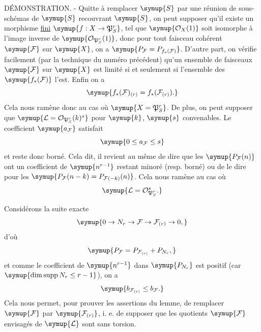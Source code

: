 DÉMONSTRATION. - Quitte à remplacer $\symup{S}$ par une réunion de sous-schémas
de $\symup{S}$ recouvrant $\symup{S}$, on peut supposer qu'il existe un morphisme \uline{fini}
$\symup{f:X\to\mathfrak P^r_S}$, tel que $\symup{\mathcal O_X(1)}$ soit isomorphe à
l'image inverse de $\symup{\mathcal O_{\mathfrak P^r_S}(1)}$, donc pour tout faisceau
cohérent $\symup{\mathcal F}$ sur $\symup{X}$, on a
$\symup{P_{\mathcal F}=P_{f_*(\mathcal F)}}$. D'autre part, on vérifie facilement (par
la technique du numéro précédent) qu'un ensemble de faisceaux $\symup{\mathcal F}$ sur
$\symup{X}$ est limité si et seulement si l'ensemble des $\symup{f_*(\mathcal F)}$ l'est.
Enfin on a
\[
\symup{f_*(\mathcal F)_{(r)}=f_*(\mathcal F_{(r)}).}
\]
Cela nous ramène donc au cas où $\symup{X=\mathfrak P^r_S}$. De plus, on peut supposer
que $\symup{\mathcal L=\mathcal O_{\mathfrak P^r_S}(k)^s}$ pour $\symup{k}$, $\symup{s}$ convenables. Le
coefficient $\symup{a_{\mathcal F}}$ satisfait
\[
\symup{0\leq a_{\mathcal F}\leq s}
\]
et reste donc borné. Cela dit, il revient au même de dire que les
$\symup{P_{\mathcal F}(n)}$ ont un coefficient de $\symup{n^{r-1}}$ restant minoré (resp.
borné) ou de le dire pour les
$\symup{P_{\mathcal F}(n-k)=P_{\mathcal F(-k)}(n)}$. Cela nous ramène au cas où
\[
\symup{\mathcal L=\mathcal O_{\mathfrak P^r_S}^{s}.}
\]

Considérons la suite exacte
\[
\symup{0\to N_r\to\mathcal F
\to\mathcal F_{(r)}\to0,}
\]
d'où
\[
\symup{P_{\mathcal F}=P_{\mathcal F_{(r)}}+P_{N_r},}
\]
et comme le coefficient de $\symup{n^{r-1}}$ dans $\symup{P_{N_r}}$ est positif (car
$\symup{\dim\operatorname{supp}N_r\leq r-1}$), on a
\[
\symup{b_{\mathcal F_{(r)}}\leq b_{\mathcal F}.}
\]
Cela nous permet, pour prouver les assertions du lemme, de remplacer
$\symup{\mathcal F}$ par $\symup{\mathcal F_{(r)}}$, i. e. de supposer que les quotients
$\symup{\mathcal F}$ envisagés de $\symup{\mathcal L}$ sont sans torsion.

